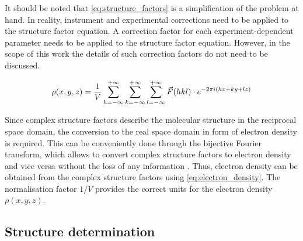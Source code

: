 It should be noted that \cref{eq:structure_factors} is a simplification of the problem at hand. In reality, instrument and experimental corrections need to be applied to the structure factor equation. A correction factor for each experiment-dependent parameter needs to be applied to the structure factor equation. However, in the scope of this work the details of such correction factors do not need to be discussed.

\begin{equation}
    \rho(x,y,z)=\frac{1}{V}\sum_{h=-\infty}^{+\infty}\sum_{k=-\infty}^{+\infty}\sum_{l=-\infty}^{+\infty}\vec{F}(hkl)\cdot e^{-2\pi\\i(hx+ky+lz)}
    \label{eq:electron_density}
\end{equation}

Since complex structure factors describe the molecular structure in the reciprocal space domain, the conversion to the real space domain in form of electron density is required. This can be conveniently done through the bijective Fourier transform, which allows to convert complex structure factors to electron density and vice versa without the loss of any information \cite{Rupp2010-nc}. Thus, electron density can be obtained from the complex structure factors using \cref{eq:electron_density}. The normalisation factor $1/V$ provides the correct units for the electron density $\rho(x,y,z)$.

\subsection{Structure determination}
